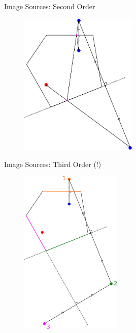 \documentclass{beamer}
\begin{document}
\begin{frame}{Image Sources: Second Order}

\begin{figure}[t]
	\centering
    \includegraphics[width=0.5\textwidth]{ImageSourcesMultiDrawn3.pdf}
\end{figure}

\end{frame}

\begin{frame}{Image Sources: Third Order (!)}

\begin{figure}[t]
	\centering
    \includegraphics[width=0.43\textwidth]{ImageSources2MultiDrawn0.pdf}
\end{figure}

\end{frame}
\end{document}
